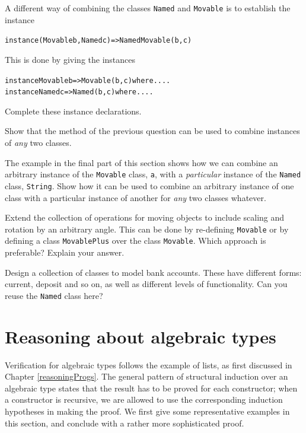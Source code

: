 \begin{exercises}
\vspace{3pt}

\item
A different way of combining the classes \texttt{Named} and \texttt{Movable} is to
establish the instance
\begin{alltt}
instance (Movable b,Named c) => NamedMovable (b,c)
\end{alltt}
This is done by giving the instances
\begin{alltt}
instance Movable b => Movable (b,c) where ....
instance Named c   => Named (b,c) where ....
\end{alltt}
Complete these instance declarations.

\item 
Show that the method of the previous question can be used to combine
instances of {\em any\/} two classes.

\item
The example in the final part of this section shows how we can combine an
arbitrary instance of the \texttt{Movable} class, \texttt{a},
with a {\em particular\/}
instance of the \texttt{Named} class, \texttt{String}. Show how it can be used to
combine an arbitrary instance of one class with a particular instance of
another for {\em any\/} two classes whatever.

\item
Extend the collection of operations for moving objects to include scaling and
rotation by an arbitrary angle. This can be done by re-defining \texttt{Movable}
or by defining a class \texttt{MovablePlus} over the class \texttt{Movable}. Which
approach is preferable? Explain your answer.

\item
Design a collection of classes to model bank accounts. These have different
forms: current, deposit and so on, as well as different levels of
functionality. Can you reuse the \texttt{Named} class here?
\end{exercises}

\section{Reasoning about algebraic types}
\label{proofAlgTypes}

Verification for algebraic types follows the example of lists, as first
discussed in Chapter \ref{reasoningProgs}. The general pattern of structural
induction over an algebraic type states that the result has to be proved for
each constructor; when a constructor is recursive, we are allowed to use the
corresponding induction hypotheses in making the proof. We first give some
representative examples in this section, and conclude with a rather more
sophisticated proof.

